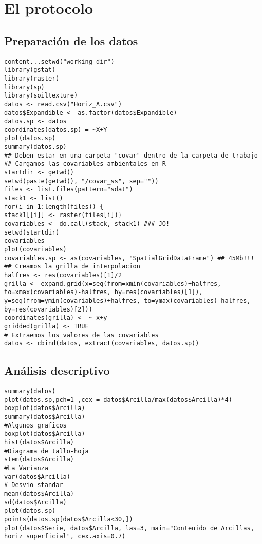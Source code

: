 \documentclass[10pt,a4paper]{article}
\begin{document}
\section{El protocolo}
\subsection{Preparación de los datos}
\begin{lstlisting}
content...setwd("working_dir")
library(gstat)
library(raster)
library(sp)
library(soiltexture)
datos <- read.csv("Horiz_A.csv")
datos$Expandible <- as.factor(datos$Expandible)
datos.sp <- datos
coordinates(datos.sp) = ~X+Y
plot(datos.sp)
summary(datos.sp)
## Deben estar en una carpeta "covar" dentro de la carpeta de trabajo
## Cargamos las covariables ambientales en R
startdir <- getwd()
setwd(paste(getwd(), "/covar_ss", sep=""))
files <- list.files(pattern="sdat")
stack1 <- list()
for(i in 1:length(files)) {
stack1[[i]] <- raster(files[i])}
covariables <- do.call(stack, stack1) ### JO!
setwd(startdir)
covariables
plot(covariables)
covariables.sp <- as(covariables, "SpatialGridDataFrame") ## 45Mb!!!
## Creamos la grilla de interpolacion
halfres <- res(covariables)[1]/2
grilla <- expand.grid(x=seq(from=xmin(covariables)+halfres, to=xmax(covariables)-halfres, by=res(covariables)[1]), y=seq(from=ymin(covariables)+halfres, to=ymax(covariables)-halfres, by=res(covariables)[2]))
coordinates(grilla) <- ~ x+y
gridded(grilla) <- TRUE
# Extraemos los valores de las covariables
datos <- cbind(datos, extract(covariables, datos.sp))
\end{lstlisting}

\subsection{Análisis descriptivo}
\begin{lstlisting}
summary(datos)
plot(datos.sp,pch=1 ,cex = datos$Arcilla/max(datos$Arcilla)*4)
boxplot(datos$Arcilla)
summary(datos$Arcilla)
#Algunos graficos
boxplot(datos$Arcilla)
hist(datos$Arcilla)
#Diagrama de tallo-hoja
stem(datos$Arcilla)
#La Varianza
var(datos$Arcilla)
# Desvio standar
mean(datos$Arcilla)
sd(datos$Arcilla)
plot(datos.sp)
points(datos.sp[datos$Arcilla<30,])
plot(datos$Serie, datos$Arcilla, las=3, main="Contenido de Arcillas, horiz superficial", cex.axis=0.7)
\end{lstlisting}
\end{document}
